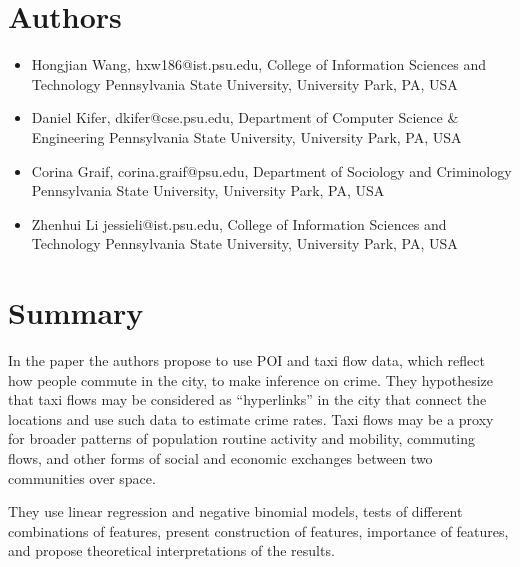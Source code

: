 \documentclass[10pt,letterpaper,english]{article}
\begin{document}
\section*{Authors}
\begin{itemize}

\item Hongjian Wang,
hxw186@ist.psu.edu,
College of Information Sciences and Technology Pennsylvania State University, University Park, PA, USA

\item  Daniel Kifer, 
dkifer@cse.psu.edu,
Department of Computer Science \& Engineering Pennsylvania State University, University Park, PA, USA


\item Corina Graif, 
corina.graif@psu.edu,
Department of Sociology and Criminology Pennsylvania State University, University Park, PA, USA

\item Zhenhui Li
jessieli@ist.psu.edu, 
College of Information Sciences and Technology Pennsylvania State University, University Park, PA, USA

\end{itemize}

\section*{Summary}

In the paper \cite{crimeRate} the authors propose to use POI and taxi flow data, which reflect how people commute in the city, to make inference on crime.  They hypothesize that taxi flows may be considered as “hyperlinks” in the city that connect the locations and use such data to estimate crime rates. Taxi flows may be a proxy for broader patterns of population routine activity and mobility, commuting flows, and other forms of social and economic exchanges between two communities over space. 

They use linear regression and negative binomial models, tests of different combinations of features, present construction of features, importance of features, and propose theoretical interpretations of the results.
\end{document}
